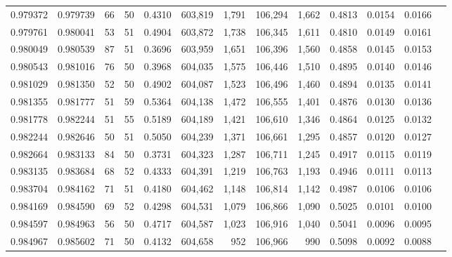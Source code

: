 \begin{tabular}{rrrrrrrrrrrrr}
0.979372 & 0.979739 &    66 &  50 &                                     0.4310 & 603,819 &   1,791 & 106,294 &   1,662 & 0.4813 & 0.0154 & 0.0166 \\
0.979761 & 0.980041 &    53 &  51 &                                     0.4904 & 603,872 &   1,738 & 106,345 &   1,611 & 0.4810 & 0.0149 & 0.0161 \\
0.980049 & 0.980539 &    87 &  51 &                                     0.3696 & 603,959 &   1,651 & 106,396 &   1,560 & 0.4858 & 0.0145 & 0.0153 \\
0.980543 & 0.981016 &    76 &  50 &                                     0.3968 & 604,035 &   1,575 & 106,446 &   1,510 & 0.4895 & 0.0140 & 0.0146 \\
0.981029 & 0.981350 &    52 &  50 &                                     0.4902 & 604,087 &   1,523 & 106,496 &   1,460 & 0.4894 & 0.0135 & 0.0141 \\
0.981355 & 0.981777 &    51 &  59 &                                     0.5364 & 604,138 &   1,472 & 106,555 &   1,401 & 0.4876 & 0.0130 & 0.0136 \\
0.981778 & 0.982244 &    51 &  55 &                                     0.5189 & 604,189 &   1,421 & 106,610 &   1,346 & 0.4864 & 0.0125 & 0.0132 \\
0.982244 & 0.982646 &    50 &  51 &                                     0.5050 & 604,239 &   1,371 & 106,661 &   1,295 & 0.4857 & 0.0120 & 0.0127 \\
0.982664 & 0.983133 &    84 &  50 &                                     0.3731 & 604,323 &   1,287 & 106,711 &   1,245 & 0.4917 & 0.0115 & 0.0119 \\
0.983135 & 0.983684 &    68 &  52 &                                     0.4333 & 604,391 &   1,219 & 106,763 &   1,193 & 0.4946 & 0.0111 & 0.0113 \\
0.983704 & 0.984162 &    71 &  51 &                                     0.4180 & 604,462 &   1,148 & 106,814 &   1,142 & 0.4987 & 0.0106 & 0.0106 \\
0.984169 & 0.984590 &    69 &  52 &                                     0.4298 & 604,531 &   1,079 & 106,866 &   1,090 & 0.5025 & 0.0101 & 0.0100 \\
0.984597 & 0.984963 &    56 &  50 &                                     0.4717 & 604,587 &   1,023 & 106,916 &   1,040 & 0.5041 & 0.0096 & 0.0095 \\
0.984967 & 0.985602 &    71 &  50 &                                     0.4132 & 604,658 &     952 & 106,966 &     990 & 0.5098 & 0.0092 & 0.0088 \\

\end{tabular}
